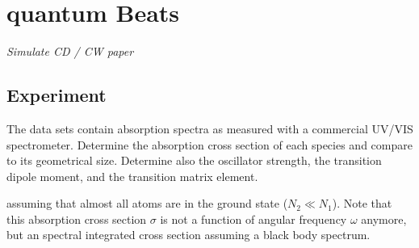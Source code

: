 \renewcommand{\lastmod}{March 26, 2020}


\chapter{quantum Beats}


\textit{Simulate CD / CW paper}




\section{Experiment}

The data sets contain absorption spectra as measured with a commercial UV/VIS spectrometer. Determine the absorption cross section of each species and compare to its geometrical size. Determine also the oscillator strength, the transition dipole moment, and the transition matrix element.

assuming that almost all atoms are in the ground state ($N_2 \ll N_1$). Note that this absorption cross section $\sigma$ is not a function of angular frequency $\omega$ anymore, but an spectral integrated cross section assuming a black body spectrum.





\printbibliography[segment=\therefsegment,heading=subbibliography]
